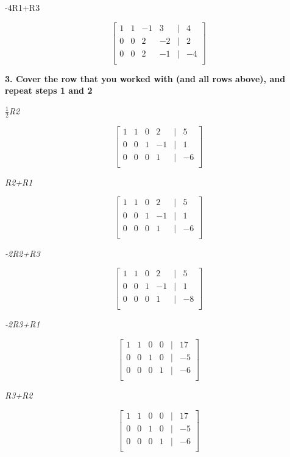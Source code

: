 \documentclass{article}
\begin{document}
-4R1+R3


\[
\begin{bmatrix}
    1 & 1 & -1 & 3 & | & 4 \\
    0 & 0 & 2 & -2 & | & 2 \\
    0 & 0 & 2 & -1 & | & -4 \\
\end{bmatrix}
\] 

\textbf{3. Cover the row that you worked with (and all rows above), and repeat steps 1 and 2}

\textit{$\frac{1}{2}$R2}

\[
\begin{bmatrix}
    1 & 1 & 0 & 2 & | & 5 \\
    0 & 0 & 1 & -1 & | & 1 \\
    0 & 0 & 0 & 1 & | & -6 \\
\end{bmatrix}
\] 

\textit{R2+R1}

\[
\begin{bmatrix}
    1 & 1 & 0 & 2 & | & 5 \\
    0 & 0 & 1 & -1 & | & 1 \\
    0 & 0 & 0 & 1 & | & -6 \\
\end{bmatrix}
\]

\textit{-2R2+R3}

\[
\begin{bmatrix}
    1 & 1 & 0 & 2 & | & 5 \\
    0 & 0 & 1 & -1 & | & 1 \\
    0 & 0 & 0 & 1 & | & -8 \\
\end{bmatrix}
\]

\textit{-2R3+R1}

\[
\begin{bmatrix}
    1 & 1 & 0 & 0 & | & 17 \\
    0 & 0 & 1 & 0 & | & -5 \\
    0 & 0 & 0 & 1 & | & -6 \\
\end{bmatrix}
\]

\textit{R3+R2}

\[
\begin{bmatrix}
    1 & 1 & 0 & 0 & | & 17 \\
    0 & 0 & 1 & 0 & | & -5 \\
    0 & 0 & 0 & 1 & | & -6 \\
\end{bmatrix}
\]
\end{document}
